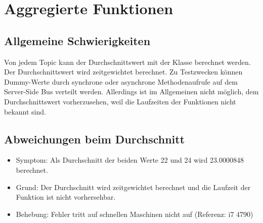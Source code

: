 \documentclass[qualitaetssicherung.tex]{subfiles}
\begin{document}
\section{Aggregierte Funktionen}

	\subsection*{Allgemeine Schwierigkeiten} 
		Von jedem Topic kann der Durchschnittswert mit der Klasse \label{Class: AverageComputation} berechnet werden. Der Durchschnittswert wird zeitgewichtet berechnet. Zu Testzwecken können Dummy-Werte durch synchrone oder asynchrone Methodenaufrufe auf dem Server-Side Bus verteilt werden. Allerdings ist im Allgemeinen nicht möglich, dem Durchschnittswert vorherzusehen, weil die Laufzeiten der Funktionen nicht bekannt sind.

	\subsection{Abweichungen beim Durchschnitt}
		\begin{itemize}
			\item
			Symptom: Als Durchschnitt der beiden Werte 22 und 24 wird 23.0000848 berechnet.
			\item
			Grund: Der Durchschnitt wird zeitgewichtet berechnet und die Laufzeit der Funktion ist nicht vorhersehbar.
			\item
			Behebung: Fehler tritt auf schnellen Maschinen nicht auf (Referenz: i7 4790)

		\end{itemize}
\end{document}
